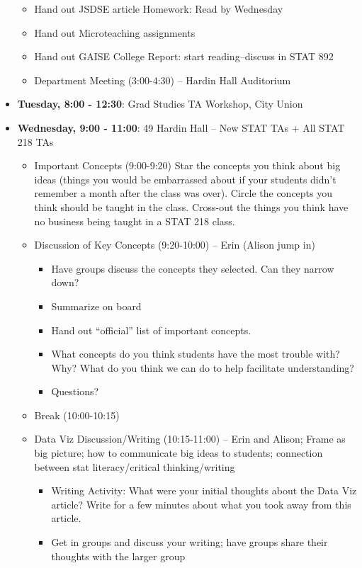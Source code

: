 \documentclass{article}
\begin{document}
\begin{itemize}
\begin{itemize}
\begin{itemize}
\end{itemize}
\item Hand out JSDSE article  Homework:  Read by Wednesday
\item Hand out Microteaching assignments
\item Hand out GAISE College Report: start reading--discuss in STAT 892
\item Department Meeting (3:00-4:30) -- Hardin Hall Auditorium
\end{itemize}
\item \textbf{Tuesday, 8:00 - 12:30}:   Grad Studies TA Workshop, City Union
\item \textbf{Wednesday, 9:00 - 11:00}: 49 Hardin Hall -- New STAT TAs + All STAT 218 TAs
\begin{itemize}
\item Important Concepts (9:00-9:20)  Star the concepts you think about big ideas (things you would be embarrassed about if your students didn't remember a month after the class was over).  Circle the concepts you think should be taught in the class.  Cross-out the things you think have no business being taught in a STAT 218 class. 
\item Discussion of Key Concepts (9:20-10:00) -- Erin (Alison jump in)
\begin{itemize}
\item Have groups discuss the concepts they selected.  Can they narrow down?
\item Summarize on board
\item Hand out ``official'' list of important concepts.
\item What concepts do you think students have the most trouble with? Why? What do you think we can do to help facilitate understanding?
\item Questions?
\end{itemize}
\item Break (10:00-10:15)
\item Data Viz Discussion/Writing (10:15-11:00) -- Erin and Alison; Frame as big picture; how to communicate big ideas to students; connection between stat literacy/critical thinking/writing
\begin{itemize}
\item Writing Activity:  What were your initial thoughts about the Data Viz article?  Write for a few minutes about what you took away from this article. 
\item Get in groups and discuss your writing; have groups share their thoughts with the larger group

\end{itemize}
\end{itemize}
\end{itemize}
\end{document}
